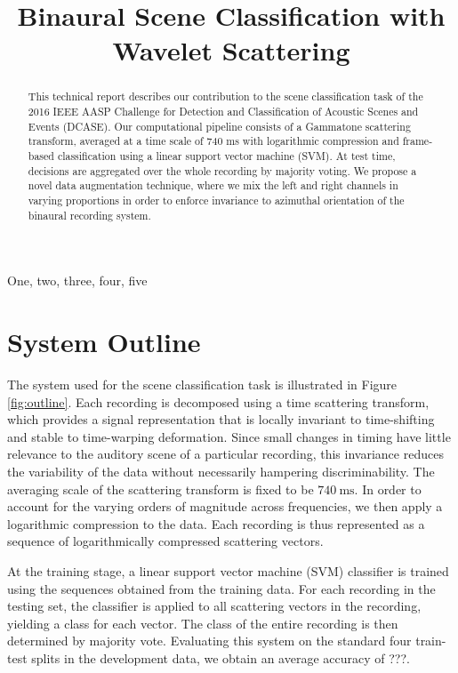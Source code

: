 \documentclass{article}
\title{Binaural Scene Classification with Wavelet Scattering}
\begin{document}
\ninept
\maketitle

\begin{sloppy}

\begin{abstract}
This technical report describes our contribution to the scene classification task of the 2016 IEEE AASP Challenge for Detection and Classification of Acoustic Scenes and Events (DCASE). Our computational pipeline consists of a Gammatone scattering transform, averaged at a time scale of 740 ms with logarithmic compression and frame-based classification using a linear support vector machine (SVM). At test time, decisions are aggregated over the whole recording by majority voting. We propose a novel data augmentation technique, where we mix the left and right channels in varying proportions in order to enforce invariance to azimuthal orientation of the binaural recording system.
\end{abstract}

\begin{keywords}
One, two, three, four, five
\end{keywords}

\section{System Outline}
\label{sec:outline}

The system used for the scene classification task is illustrated in Figure \ref{fig:outline}. Each recording is decomposed using a time scattering transform, which provides a signal representation that is locally invariant to time-shifting and stable to time-warping deformation. Since small changes in timing have little relevance to the auditory scene of a particular recording, this invariance reduces the variability of the data without necessarily hampering discriminability. The averaging scale of the scattering transform is fixed to be $740~\mathrm{ms}$. In order to account for the varying orders of magnitude across frequencies, we then apply a logarithmic compression to the data. Each recording is thus represented as a sequence of logarithmically compressed scattering vectors.

At the training stage, a linear support vector machine (SVM) classifier is trained using the sequences obtained from the training data. For each recording in the testing set, the classifier is applied to all scattering vectors in the recording, yielding a class for each vector. The class of the entire recording is then determined by majority vote. Evaluating this system on the standard four train-test splits in the development data, we obtain an average accuracy of ???.


\end{sloppy}
\end{document}
